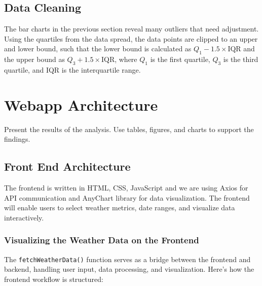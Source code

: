 \documentclass[a4paper, 12pt]{article}
\begin{document}
\subsection{Data Cleaning}
The bar charts in the previous section reveal many outliers that need adjustment. Using the quartiles from the data spread, the data points are clipped to an upper and lower bound, such that the lower bound is calculated as \( Q_1 - 1.5 \times \text{IQR} \) and the upper bound as \( Q_3 + 1.5 \times \text{IQR} \), where \( Q_1 \) is the first quartile, \( Q_3 \) is the third quartile, and IQR is the interquartile range.


\section{Webapp Architecture}
\label{sec:Webapp Archictecture}
Present the results of the analysis. Use tables, figures, and charts to support the findings.

\subsection{Front End Architecture}
The frontend is written in HTML, CSS, JavaScript and we are using Axios for API communication and AnyChart library for data visualization. The frontend will enable users to select weather metrics, date ranges, and visualize data interactively.

\subsubsection{Visualizing the Weather Data on the Frontend}
The \texttt{fetchWeatherData()} function serves as a bridge between the frontend and backend, handling user input, data processing, and visualization. Here's how the frontend workflow is structured:
\end{document}
